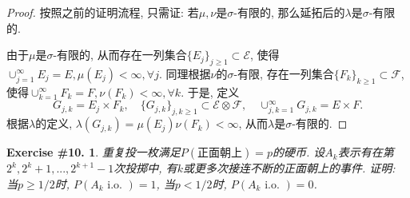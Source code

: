\documentclass[UTF8, a4paper]{article}
\newtheorem{exercise}{Exercise \#10.}
\begin{document}
\begin{proof}
按照之前的证明流程, 只需证: 若\(\mu, \nu\)是\(\sigma\)-有限的, 那么延拓后的\(\lambda\)是\(\sigma\)-有限的.

由于\(\mu\)是\(\sigma\)-有限的, 从而存在一列集合\(\{E_j\}_{j\geq 1} \subset \mathcal{E}\), 使得\(\cup_{j=1}^\infty E_j = E, \mu(E_j) < \infty, \forall j\).
同理根据\(\nu\)的\(\sigma\)-有限, 存在一列集合\(\{F_k\}_{k\geq 1} \subset \mathcal{F}\), 使得\(\cup_{k=1}^\infty F_k = F, \nu(F_k) < \infty, \forall k\).
于是, 定义 
$$
G_{j,k} = E_j \times F_k, \quad \{G_{j,k}\}_{j,k\geq 1} \subset \mathcal{E} \otimes \mathcal{F}, \quad \cup_{j,k=1}^\infty G_{j,k} = E\times F.
$$
根据\(\lambda\)的定义, \(\lambda(G_{j,k}) = \mu(E_j)\nu(F_k) < \infty\), 从而\(\lambda\)是\(\sigma\)-有限的.
\end{proof}


\begin{framed}
\begin{exercise}
重复投一枚满足\(P(\text{正面朝上}) = p\)的硬币. 
设\(A_k\)表示有在第\(2^k, 2^k+1, ..., 2^{k+1} - 1\)次投掷中, 有\(k\)或更多次接连不断的正面朝上的事件.
证明: 当\(p \geq 1/2\)时, \(P(A_k\text { i.o. }) = 1\), 当\(p<1/2\)时, \(P(A_k\text { i.o. }) = 0\).
\end{exercise}
\end{framed}
\end{document}

